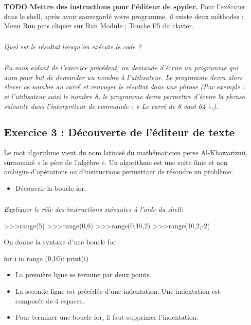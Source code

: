\documentclass[10pt]{article}
\begin{document}
\textbf{TODO Mettre des instructions pour l'éditeur de spyder.}
Pour l’exécuter dans le shell, après avoir sauvegardé votre programme, il existe deux méthodes : 
 	Menu Run puis cliquer sur Run Module ;
 	Touche F5 du clavier.

\subparagraph{}
\textit{Quel est le résultat lorsqu’on exécute le code ?}

\subparagraph{}
\textit{En vous aidant de l’exercice précédent, on demande d’écrire un programme qui aura pour but de demander un nombre à l’utilisateur. Le programme devra alors élever ce nombre au carré et renvoyer le résultat dans une phrase (Par exemple : si l’utilisateur saisi le nombre 8, le programme devra permettre d’écrire la phrase suivante dans l’interpréteur de commande : « Le carré de 8 vaut 64 ».).}


\subsection*{Exercice 3 : Découverte de l'éditeur de texte}
\setcounter{subparagraph}{0}

\begin{defi}
Le mot algorithme vient du nom latinisé du mathématicien perse Al-Khawarizmi, surnommé « le père de l’algèbre ». Un algorithme est une suite finie et non ambigüe d’opérations ou d’instructions permettant de résoudre un problème.
\end{defi}

\begin{obj}
\begin{itemize}
\item Découvrir la boucle \textsf{for}.
\end{itemize}
\end{obj}

\subparagraph{}
\textit{Expliquer le rôle des instructions suivantes à l’aide du shell:}

\begin{py}
\begin{python}
>>>range(5)
>>>range(0,6)
>>>range(0,10,2)
>>>range(10,2,-2)
\end{python}
\end{py}

On donne la syntaxe d'une boucle \textsf{for} :

\begin{py}
\begin{python}
for i in range (0,10):
    print(i)
\end{python}
\end{py}
\begin{rem}
\begin{itemize}
\item La première ligne se termine par deux points.
\item La seconde ligne est précédée d’une indentation. Une indentation est composée de 4 espaces. 
\item Pour terminer une boucle \textsf{for}, il faut supprimer l’indentation.
\end{itemize}
\end{rem}
\end{document}
